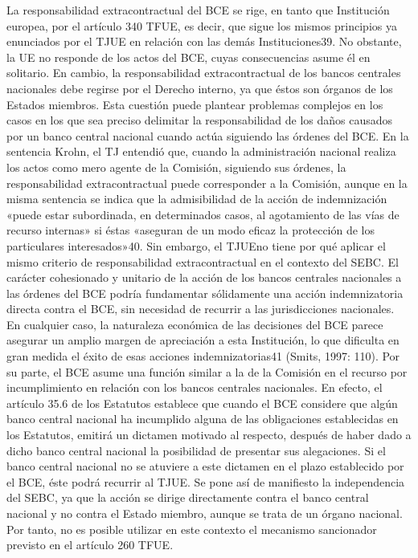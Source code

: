 \documentclass[10pt,a4paper]{article}
\begin{document}
La responsabilidad extracontractual del BCE se rige, en tanto que Institución europea, por el artículo 340 TFUE, es decir, que sigue los mismos principios ya enunciados por el TJUE en relación con las demás Instituciones39. No obstante, la UE no responde de los actos del BCE, cuyas consecuencias asume él en solitario. En cambio, la responsabilidad extracontractual de los bancos centrales nacionales debe regirse por el Derecho interno, ya que éstos son órganos de los Estados miembros. Esta cuestión puede plantear problemas complejos en los casos en los que sea preciso delimitar la responsabilidad de los daños causados por un banco central nacional cuando actúa siguiendo las órdenes del BCE. En la sentencia Krohn, el TJ entendió que, cuando la administración nacional realiza los actos como mero agente de la Comisión, siguiendo sus órdenes, la responsabilidad extracontractual puede corresponder a la Comisión, aunque en la misma sentencia se indica que la admisibilidad de la acción de indemnización «puede estar subordinada, en determinados casos, al agotamiento de las vías de recurso internas» si éstas «aseguran de un modo eficaz la protección de los particulares interesados»40. Sin embargo, el TJUEno tiene por qué aplicar el mismo criterio de responsabilidad extracontractual en el contexto del SEBC. El carácter cohesionado y unitario de la acción de los bancos centrales nacionales a las órdenes del BCE podría fundamentar sólidamente una acción indemnizatoria directa contra el BCE, sin necesidad de recurrir a las jurisdicciones nacionales. En cualquier caso, la naturaleza  económica de las decisiones del BCE parece asegurar un amplio margen de apreciación a esta Institución, lo que dificulta en gran medida el éxito de esas acciones indemnizatorias41 (Smits, 1997: 110). Por su parte, el BCE asume una función similar a la de la Comisión en el recurso por incumplimiento en relación con los bancos centrales nacionales. En efecto, el artículo 35.6 de los Estatutos establece que cuando el BCE considere que algún banco central nacional ha incumplido alguna de las obligaciones establecidas en los Estatutos, emitirá un dictamen motivado al respecto, después de haber dado a dicho banco central nacional la posibilidad de presentar sus alegaciones. Si el banco central nacional no se atuviere a este dictamen en el plazo establecido por el BCE, éste podrá recurrir al TJUE. Se pone así de manifiesto la independencia del SEBC, ya que la acción se dirige directamente contra el banco central nacional y no contra el Estado miembro, aunque se trata de un órgano nacional. Por tanto, no es posible utilizar en este contexto el mecanismo sancionador previsto en el artículo 260 TFUE.
\end{document}
